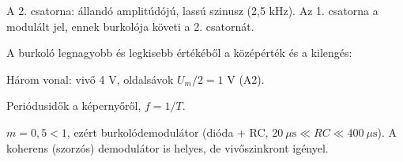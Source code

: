 A 2. csatorna: állandó amplitúdójú, lassú szinusz (2,5 kHz). Az 1. csatorna a modulált jel, ennek burkolója követi a 2. csatornát.

A burkoló legnagyobb és legkisebb értékéből a középérték és a kilengés:

\begin{center}\end{center}

\begin{center}\end{center}

Három vonal: vivő 4 V, oldalsávok $U_m/2=1$ V (A2).

\begin{center}\end{center}

Periódusidők a képernyőről, $f=1/T$.

\begin{center}\end{center}

\begin{center}\end{center}

$m=0{,}5<1$, ezért burkolódemodulátor (dióda + RC, $20\ \mu\text{s}\ll RC\ll400\ \mu\text{s}$). A koherens (szorzós) demodulátor is helyes, de vivőszinkront igényel.

